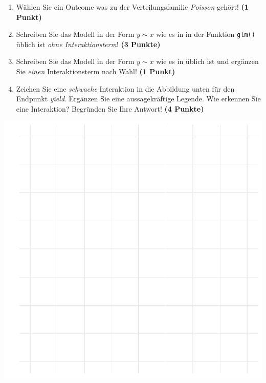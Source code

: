 \documentclass[a4paper, 10pt]{scrartcl}\usepackage[]{graphicx}\usepackage[]{xcolor}
\makeatletter
\def\maxwidth{ %
  \ifdim\Gin@nat@width>\linewidth
    \linewidth
  \else
    \Gin@nat@width
  \fi
}
\makeatother
\begin{document}
\begin{enumerate}
\item W{\"a}hlen Sie ein Outcome was zu der Verteilungsfamilie
  \textit{Poisson} geh{\"o}rt! \textbf{(1 Punkt)}
\item Schreiben Sie das Modell in der Form $y \sim x$ wie es in \Rlogo in
  der Funktion \texttt{glm()}
  {\"u}blich ist \textit{ohne Interaktionsterm}! \textbf{(3 Punkte)}
\item Schreiben Sie das Modell in der Form $y \sim x$ wie es in \Rlogo
  {\"u}blich ist und erg{\"a}nzen Sie \textit{einen} Interaktionsterm nach Wahl! \textbf{(1 Punkt)} 
\item Zeichen Sie eine \textit{schwache}
  Interaktion in die Abbildung unten f{\"u}r den Endpunkt
  \textit{yield}. Erg{\"a}nzen Sie eine aussagekr{\"a}ftige Legende. Wie erkennen
  Sie eine Interaktion? Begr{\"u}nden Sie Ihre Antwort! \textbf{(4 Punkte)}
\end{enumerate}



{\centering \includegraphics[width=\maxwidth]{img/modeling-R-01-1} 

}


 
\clearpage
\end{document}
